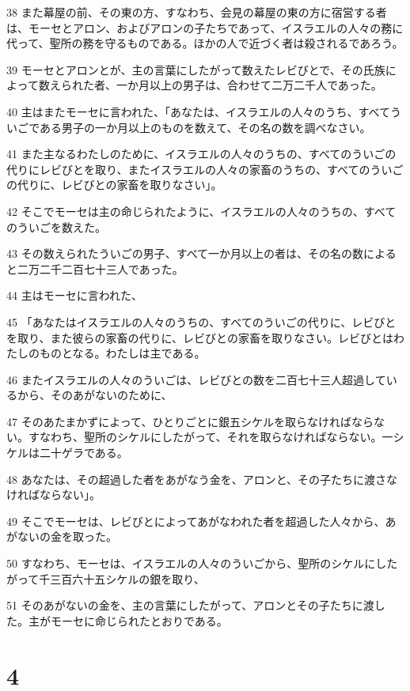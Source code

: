 \par 38 また幕屋の前、その東の方、すなわち、会見の幕屋の東の方に宿営する者は、モーセとアロン、およびアロンの子たちであって、イスラエルの人々の務に代って、聖所の務を守るものである。ほかの人で近づく者は殺されるであろう。
\par 39 モーセとアロンとが、主の言葉にしたがって数えたレビびとで、その氏族によって数えられた者、一か月以上の男子は、合わせて二万二千人であった。
\par 40 主はまたモーセに言われた、「あなたは、イスラエルの人々のうち、すべてういごである男子の一か月以上のものを数えて、その名の数を調べなさい。
\par 41 また主なるわたしのために、イスラエルの人々のうちの、すべてのういごの代りにレビびとを取り、またイスラエルの人々の家畜のうちの、すべてのういごの代りに、レビびとの家畜を取りなさい」。
\par 42 そこでモーセは主の命じられたように、イスラエルの人々のうちの、すべてのういごを数えた。
\par 43 その数えられたういごの男子、すべて一か月以上の者は、その名の数によると二万二千二百七十三人であった。
\par 44 主はモーセに言われた、
\par 45 「あなたはイスラエルの人々のうちの、すべてのういごの代りに、レビびとを取り、また彼らの家畜の代りに、レビびとの家畜を取りなさい。レビびとはわたしのものとなる。わたしは主である。
\par 46 またイスラエルの人々のういごは、レビびとの数を二百七十三人超過しているから、そのあがないのために、
\par 47 そのあたまかずによって、ひとりごとに銀五シケルを取らなければならない。すなわち、聖所のシケルにしたがって、それを取らなければならない。一シケルは二十ゲラである。
\par 48 あなたは、その超過した者をあがなう金を、アロンと、その子たちに渡さなければならない」。
\par 49 そこでモーセは、レビびとによってあがなわれた者を超過した人々から、あがないの金を取った。
\par 50 すなわち、モーセは、イスラエルの人々のういごから、聖所のシケルにしたがって千三百六十五シケルの銀を取り、
\par 51 そのあがないの金を、主の言葉にしたがって、アロンとその子たちに渡した。主がモーセに命じられたとおりである。

\chapter{4}

